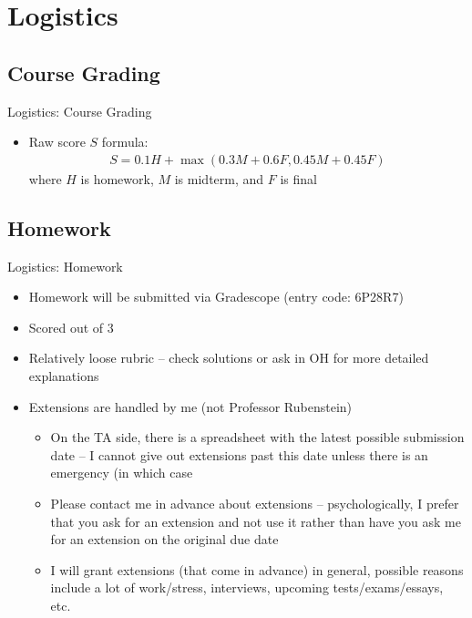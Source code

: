 \documentclass{../slides}
\begin{document}
\section{Logistics}
\subsection{Course Grading}
\begin{frame}{Logistics: Course Grading}
    \begin{itemize}
        \item Raw score $S$ formula:
        \begin{gather*}
            S = 0.1H + \max{\left(0.3M + 0.6F, 0.45M + 0.45F\right)} 
        \end{gather*}
        where $H$ is homework, $M$ is midterm, and $F$ is final
    \end{itemize}
\end{frame}

\subsection{Homework}
\begin{frame}{Logistics: Homework}
    \begin{itemize}
        \item Homework will be submitted via Gradescope (entry code: 6P28R7)
        \item Scored out of $3$
        \item Relatively loose rubric -- check solutions or ask in OH for more detailed explanations
        \item Extensions are handled by me (not Professor Rubenstein)
        \begin{itemize}
            \item On the TA side, there is a spreadsheet with the latest possible submission date -- I cannot give out extensions past this date unless there is an emergency (in which case 
            \item Please contact me in advance about extensions -- psychologically, I prefer that you ask for an extension and not use it rather than have you ask me for an extension on the original due date
            \item I will grant extensions (that come in advance) in general, possible reasons include a lot of work/stress, interviews, upcoming tests/exams/essays, etc.
        \end{itemize}
    \end{itemize}
\end{frame}
\end{document}
